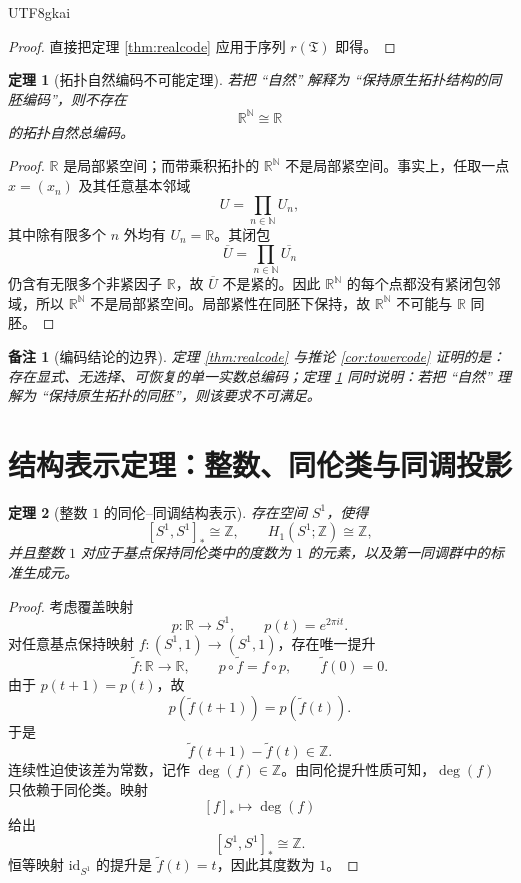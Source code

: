 \documentclass[12pt]{article}
\newtheorem{theorem}{定理}[section]
\newtheorem{remark}{备注}[section]
\newcommand{\NN}{\mathbb{N}}
\newcommand{\ZZ}{\mathbb{Z}}
\newcommand{\RR}{\mathbb{R}}
\newcommand{\id}{\mathrm{id}}
\begin{document}
\begin{CJK*}{UTF8}{gkai}
\begin{proof}
直接把定理 \ref{thm:realcode} 应用于序列 $r(\mathfrak T)$ 即得。
\end{proof}

\begin{theorem}[拓扑自然编码不可能定理]\label{thm:notop}
若把 ``自然'' 解释为 ``保持原生拓扑结构的同胚编码''，则不存在
\[
\RR^\NN\cong \RR
\]
的拓扑自然总编码。
\end{theorem}

\begin{proof}
$\RR$ 是局部紧空间；而带乘积拓扑的 $\RR^\NN$ 不是局部紧空间。事实上，任取一点 $x=(x_n)$ 及其任意基本邻域
\[
U=\prod_{n\in\NN}U_n,
\]
其中除有限多个 $n$ 外均有 $U_n=\RR$。其闭包
\[
\overline U=\prod_{n\in\NN}\overline{U_n}
\]
仍含有无限多个非紧因子 $\RR$，故 $\overline U$ 不是紧的。因此 $\RR^\NN$ 的每个点都没有紧闭包邻域，所以 $\RR^\NN$ 不是局部紧空间。局部紧性在同胚下保持，故 $\RR^\NN$ 不可能与 $\RR$
  同胚。
\end{proof}

\begin{remark}[编码结论的边界]
定理 \ref{thm:realcode} 与推论 \ref{cor:towercode} 证明的是：存在显式、无选择、可恢复的单一实数总编码；定理 \ref{thm:notop} 同时说明：若把 ``自然'' 理解为
  ``保持原生拓扑的同胚''，则该要求不可满足。
\end{remark}

\section{结构表示定理：整数、同伦类与同调投影}
\label{sec:tex35-structure}

\begin{theorem}[整数 $1$ 的同伦--同调结构表示]\label{thm:one}
存在空间 $S^1$，使得
\[
[S^1,S^1]_*\cong \ZZ,
\qquad
H_1(S^1;\ZZ)\cong \ZZ,
\]
并且整数 $1$ 对应于基点保持同伦类中的度数为 $1$ 的元素，以及第一同调群中的标准生成元。
\end{theorem}

\begin{proof}
考虑覆盖映射
\[
p:\RR\to S^1,
\qquad
p(t)=e^{2\pi i t}.
\]
对任意基点保持映射 $f:(S^1,1)\to(S^1,1)$，存在唯一提升
\[
\widetilde f:\RR\to\RR,
\qquad
p\circ\widetilde f=f\circ p,
\qquad
\widetilde f(0)=0.
\]
由于 $p(t+1)=p(t)$，故
\[
p(\widetilde f(t+1))=p(\widetilde f(t)).
\]
于是
\[
\widetilde f(t+1)-\widetilde f(t)\in\ZZ.
\]
连续性迫使该差为常数，记作 $\deg(f)\in\ZZ$。由同伦提升性质可知，$\deg(f)$ 只依赖于同伦类。映射
\[
[f]_*\mapsto \deg(f)
\]
给出
\[
[S^1,S^1]_*\cong \ZZ.
\]
恒等映射 $\id_{S^1}$ 的提升是 $\widetilde f(t)=t$，因此其度数为 $1$。


\end{proof}
\end{CJK*}
\end{document}
